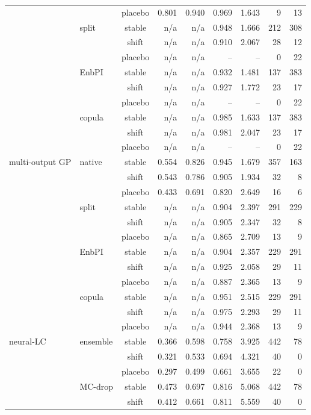 {\begin{longtable}{@{}llcrrrrrr@{}}
 &  & placebo & 0.801 & 0.940 & 0.969 & 1.643 & 9 & 13 \\
 & split & stable & n/a & n/a & 0.948 & 1.666 & 212 & 308 \\
 &  & shift & n/a & n/a & 0.910 & 2.067 & 28 & 12 \\
 &  & placebo & n/a & n/a & -- & -- & 0 & 22 \\
 & EnbPI & stable & n/a & n/a & 0.932 & 1.481 & 137 & 383 \\
 &  & shift & n/a & n/a & 0.927 & 1.772 & 23 & 17 \\
 &  & placebo & n/a & n/a & -- & -- & 0 & 22 \\
 & copula & stable & n/a & n/a & 0.985 & 1.633 & 137 & 383 \\
 &  & shift & n/a & n/a & 0.981 & 2.047 & 23 & 17 \\
 &  & placebo & n/a & n/a & -- & -- & 0 & 22 \\
\addlinespace[2pt]
multi-output GP & native & stable & 0.554 & 0.826 & 0.945 & 1.679 & 357 & 163 \\
 &  & shift & 0.543 & 0.786 & 0.905 & 1.934 & 32 & 8 \\
 &  & placebo & 0.433 & 0.691 & 0.820 & 2.649 & 16 & 6 \\
 & split & stable & n/a & n/a & 0.904 & 2.397 & 291 & 229 \\
 &  & shift & n/a & n/a & 0.905 & 2.347 & 32 & 8 \\
 &  & placebo & n/a & n/a & 0.865 & 2.709 & 13 & 9 \\
 & EnbPI & stable & n/a & n/a & 0.904 & 2.357 & 229 & 291 \\
 &  & shift & n/a & n/a & 0.925 & 2.058 & 29 & 11 \\
 &  & placebo & n/a & n/a & 0.887 & 2.365 & 13 & 9 \\
 & copula & stable & n/a & n/a & 0.951 & 2.515 & 229 & 291 \\
 &  & shift & n/a & n/a & 0.975 & 2.293 & 29 & 11 \\
 &  & placebo & n/a & n/a & 0.944 & 2.368 & 13 & 9 \\
\addlinespace[2pt]
neural-LC & ensemble & stable & 0.366 & 0.598 & 0.758 & 3.925 & 442 & 78 \\
 &  & shift & 0.321 & 0.533 & 0.694 & 4.321 & 40 & 0 \\
 &  & placebo & 0.297 & 0.499 & 0.661 & 3.655 & 22 & 0 \\
 & MC-drop & stable & 0.473 & 0.697 & 0.816 & 5.068 & 442 & 78 \\
 &  & shift & 0.412 & 0.661 & 0.811 & 5.559 & 40 & 0 \\

\end{longtable}}
